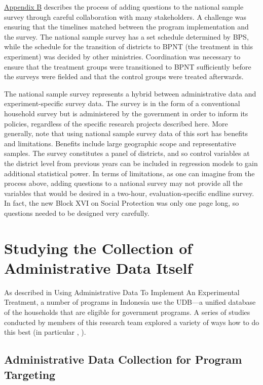 \protect\hyperlink{indonesia-appendixb}{Appendix B} describes the process of adding questions to the national sample survey through careful collaboration with many stakeholders. A challenge was ensuring that the timelines matched between the program implementation and the survey. The national sample survey has a set schedule determined by BPS, while the schedule for the transition of districts to BPNT (the treatment in this experiment) was decided by other ministries. Coordination was necessary to ensure that the treatment groups were transitioned to BPNT sufficiently before the surveys were fielded and that the control groups were treated afterwards.

The national sample survey represents a hybrid between administrative data and experiment-specific survey data. The survey is in the form of a conventional household survey but is administered by the government in order to inform its policies, regardless of the specific research projects described here. More generally, note that using national sample survey data of this sort has benefits and limitations. Benefits include large geographic scope and representative samples. The survey constitutes a panel of districts, and so control variables at the district level from previous years can be included in regression models to gain additional statistical power. In terms of limitations, as one can imagine from the process above, adding questions to a national survey may not provide all the variables that would be desired in a two-hour, evaluation-specific endline survey. In fact, the new Block XVI on Social Protection was only one page long, so questions needed to be designed very carefully.

\hypertarget{studying-the-collection-of-administrative-data-itself}{%
\section{Studying the Collection of Administrative Data Itself}\label{studying-the-collection-of-administrative-data-itself}}

As described in Using Administrative Data To Implement An Experimental Treatment, a number of programs in Indonesia use the UDB---a unified database of the households that are eligible for government programs. A series of studies conducted by members of this research team explored a variety of ways how to do this best (in particular \citet{alatas2012}, \citet{alatas2016}).

\hypertarget{administrative-data-collection-for-program-targeting}{%
\subsection{Administrative Data Collection for Program Targeting}\label{administrative-data-collection-for-program-targeting}}


